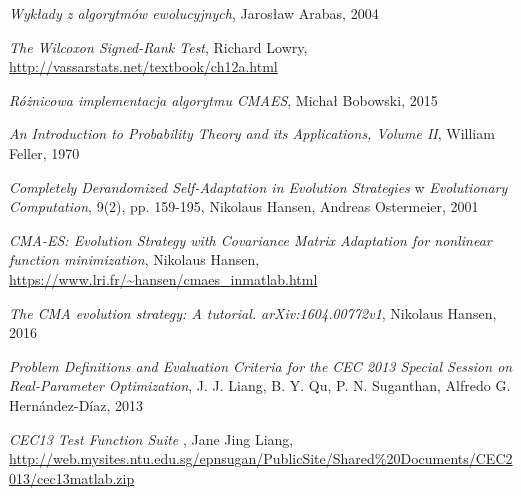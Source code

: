 \documentclass{mini}
\begin{document}
\begin{thebibliography}{9}

\emph{Wykłady z algorytmów ewolucyjnych}, Jarosław Arabas, 2004

\emph{The Wilcoxon Signed-Rank Test}, Richard Lowry, \url{http://vassarstats.net/textbook/ch12a.html}

\emph{Różnicowa implementacja algorytmu CMAES}, Michał Bobowski, 2015

\emph{An Introduction to Probability Theory and its Applications, Volume II}, William Feller, 1970

\emph{Completely Derandomized Self-Adaptation in Evolution Strategies} w \emph{Evolutionary Computation}, 9(2), pp. 159-195, Nikolaus Hansen, Andreas Ostermeier, 2001

\emph{CMA-ES: Evolution Strategy with Covariance Matrix Adaptation for nonlinear function minimization}, Nikolaus Hansen, \url{https://www.lri.fr/~hansen/cmaes\_inmatlab.html}

\emph{The CMA evolution strategy: A tutorial. arXiv:1604.00772v1},  Nikolaus Hansen, 2016

\emph{Problem Definitions and Evaluation Criteria for the CEC 2013 Special Session on Real-Parameter Optimization}, J. J. Liang, B. Y. Qu, P. N. Suganthan, Alfredo G. Hernández-Díaz, 2013

\emph{CEC13 Test Function Suite }, Jane Jing Liang, \url{http://web.mysites.ntu.edu.sg/epnsugan/PublicSite/Shared%20Documents/CEC2013/cec13matlab.zip}

\end{thebibliography}

\makestatement
\end{document}
